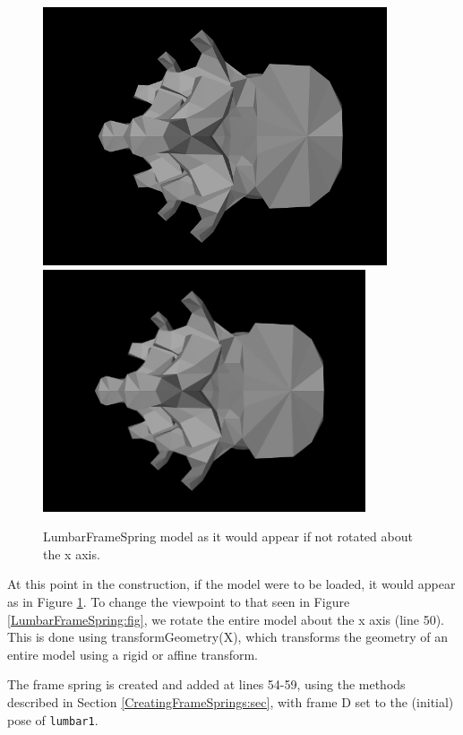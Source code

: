 \begin{figure}[ht]
\begin{center}
\iflatexml
 \includegraphics[]{images/LumbarFrameSpringNoflip}
\else
 \includegraphics[width=3.75in]{images/LumbarFrameSpringNoflip}
\fi
\end{center}
\caption{LumbarFrameSpring model as it would appear if not rotated
about the x axis.}
\label{LumbarFrameSpringNoflip:fig}
\end{figure}

At this point in the construction, if the model were to be loaded, it
would appear as in Figure \ref{LumbarFrameSpringNoflip:fig}. To change
the viewpoint to that seen in Figure \ref{LumbarFrameSpring:fig}, we
rotate the entire model about the x axis (line 50).  This is done
using
{transformGeometry(X)}, which transforms the geometry of an entire
model using a rigid or affine transform.

The frame spring is created and added at lines 54-59, using the
methods described in Section \ref{CreatingFrameSprings:sec}, with
frame D set to the (initial) pose of {\tt lumbar1}.

